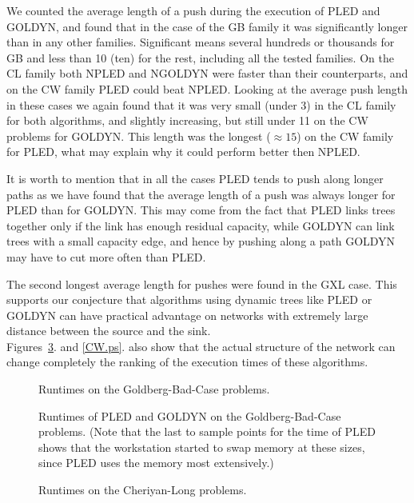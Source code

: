 We counted the average length of a push during
the execution of PLED and GOLDYN, and found that in the case of the GB
family it was significantly longer than in any other families. 
Significant means several hundreds or thousands for GB and less than
10 (ten) for the rest, including all the tested families. On the CL
family 
both NPLED and NGOLDYN were faster than their counterparts, and on the
CW family PLED could beat NPLED. Looking at the average push length in
these cases we again found that it was very small (under 3) in the CL
family for both algorithms, and slightly increasing, but still under 11
on the CW problems for GOLDYN. This length was the longest ($\approx
15$) on the CW family for PLED, what may explain why it could perform
better then NPLED.

   
It is worth to mention that in all the
cases PLED tends to push along longer paths as we have found that the
average 
length of a push was always longer for PLED than for GOLDYN. This
may come from the fact that PLED links trees together only if the link
has enough residual capacity, while GOLDYN can link trees with a small
capacity edge, and hence by pushing along a path GOLDYN may have to cut
more often than PLED.

   
The second longest average length for pushes were found in the GXL
case. This supports our 
conjecture that algorithms using dynamic trees like PLED or GOLDYN can
have practical advantage on networks with extremely large distance
between the source and the sink.\\

Figures~\ref{CL.ps}. and \ref{CW.ps}. also show that the actual
structure of the network can change completely the ranking of the
execution times of these algorithms.

\begin{figure}[h]
\centerline{}
\caption{Runtimes on the Goldberg-Bad-Case problems. \label {GB.ps}}
\end{figure}

\begin{figure}[h]
\centerline{}
\caption{Runtimes of PLED and GOLDYN on the Goldberg-Bad-Case
problems. (Note that the last to sample points for the time of PLED
shows that the workstation started to swap memory at these sizes,
since PLED uses the memory most extensively.) \label {GB1.ps}}
\end{figure}

\begin{figure}[h]
\centerline{}
\caption{ Runtimes on the Cheriyan-Long problems. \label {CL.ps} }
\end{figure}

